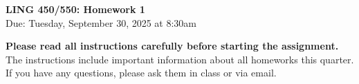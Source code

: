 \documentclass[12pt, letterpaper]{article}
\begin{document}


\begin{center}
    {\Large \textbf{LING 450/550: Homework 1}}\\
    {\large Due: Tuesday, September 30, 2025 at 8:30am}
\end{center}
\thispagestyle{fancy}



\textbf{Please read all instructions carefully before starting the assignment.} The instructions include important information about all homeworks this quarter. If you have any questions, please ask them in class or via email.
\end{document}
